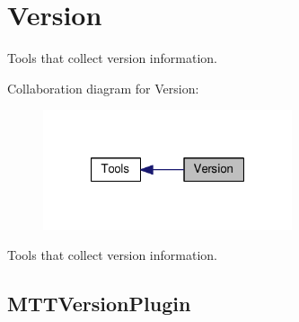 \hypertarget{group__Version}{\section{Version}
\label{group__Version}
}


Tools that collect version information.  


Collaboration diagram for Version\-:
\nopagebreak
\begin{figure}[H]
\begin{center}
\leavevmode
\includegraphics[width=208pt]{group__Version}
\end{center}
\end{figure}
Tools that collect version information. \hypertarget{MTTVersionPlugin.py_MTTVersionPlugin}{}\subsection{M\-T\-T\-Version\-Plugin}\label{MTTVersionPlugin.py_MTTVersionPlugin}
